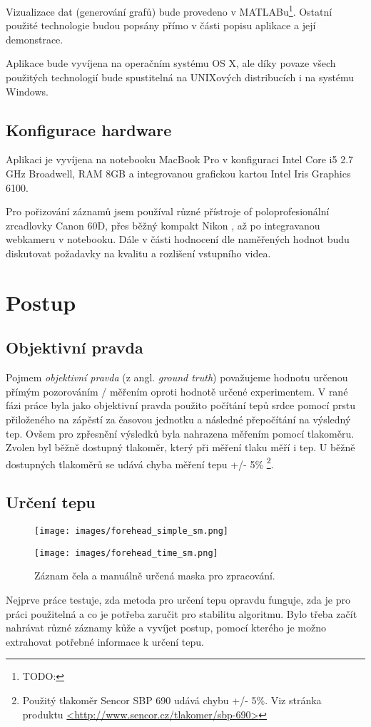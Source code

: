 \documentclass[
  digital, %
  table,   %
%
  lof,     %
  lot,     %
]{fithesis3}
\begin{document}
Vizualizace dat (generování grafů) bude provedeno v MATLABu\footnote{TODO:}. Ostatní použité technologie budou popsány přímo v části popisu aplikace a její demonstrace.

Aplikace bude vyvíjena na operačním systému OS X, ale díky povaze všech použitých technologií bude spustitelná na UNIXových distribucích i na systému Windows.

\section{Konfigurace hardware}
Aplikaci je vyvíjena na notebooku MacBook Pro v konfiguraci Intel Core i5 2.7 GHz Broadwell, RAM 8GB a integrovanou grafickou kartou Intel Iris Graphics 6100.

Pro pořizování záznamů jsem používal různé přístroje of poloprofesionální zrcadlovky Canon 60D, přes běžný kompakt Nikon
, až po integravanou webkameru v notebooku. Dále v části hodnocení dle naměřených hodnot budu diskutovat požadavky na kvalitu a rozlišení vstupního videa.

\chapter{Postup}
\section{Objektivní pravda}
Pojmem \emph{objektivní pravda} (z angl. \emph{ground truth}) považujeme hodnotu určenou přímým pozorováním / měřením oproti hodnotě určené experimentem. V rané fázi práce byla jako objektivní pravda použito počítání tepů srdce pomocí prstu přiloženého na zápěstí za časovou jednotku a následné přepočítání na výsledný tep. Ovšem pro zpřesnění výsledků byla nahrazena měřením pomocí tlakoměru. Zvolen byl běžně dostupný tlakoměr, který při měření tlaku měří i tep. U běžně dostupných tlakoměrů se udává chyba měření tepu +/- 5\% \footnote{Použitý tlakoměr Sencor SBP 690 udává chybu +/- 5\%. Viz stránka produktu \url{<http://www.sencor.cz/tlakomer/sbp-690>}}.

\section{Určení tepu}
\begin{figure}
  \begin{minipage}{.5\textwidth}
    \texttt{[image: images/forehead\_simple\_sm.png]}
  \end{minipage}
  \begin{minipage}{.5\textwidth}
    \texttt{[image: images/forehead\_time\_sm.png]}
  \end{minipage}
  \caption{Záznam čela a manuálně určená maska pro zpracování.}
  \label{fig:initial-proof-forehead}
\end{figure}
Nejprve práce testuje, zda metoda pro určení tepu opravdu funguje, zda je pro práci použitelná a co je potřeba zaručit pro stabilitu algoritmu. Bylo třeba začít nahrávat různé záznamy kůže a vyvíjet postup, pomocí kterého je možno extrahovat potřebné informace k určení tepu.
\end{document}
